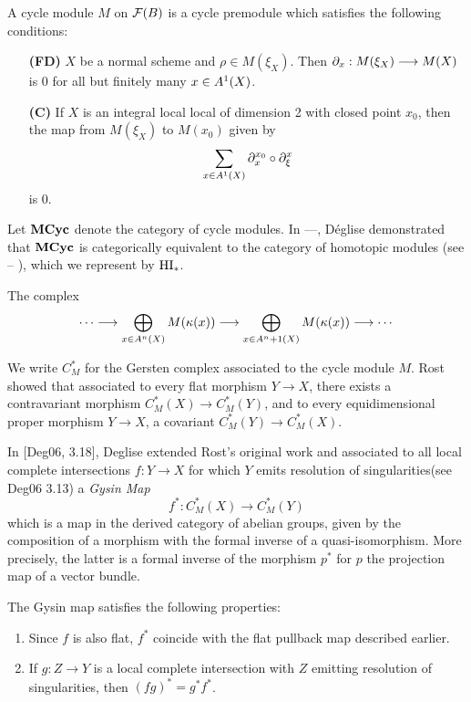 \begin{definition}
A cycle module $M$ on $\fields(B)$ is a cycle premodule which
satisfies the following conditions:

\begin{enumerate}
\item[\textbf{(FD)}]  
$X$ be a normal scheme and $\rho \in M(\xi_X)$. Then $\res{x}: 
M(\xi_X) \to M(X)$ is 0 for all but finitely many $x \in 
\subsch{1}{X}$.

\item[\textbf{(C)}]  If $X$ is an integral
local local of dimension 2 with closed point $x_0$, then the map 
from $M(\xi_X)$ to $M(x_0)$ given by
\[
\sum_{x \in \subsch{1}{X}} \ptres{x_0}{x} \comp \ptres{x}{\xi}
\]
is 0.
\end{enumerate}
\end{definition}

Let $\Cat{MCyc}$ denote the category of cycle modules. In ---,
D\'eglise demonstrated that $\Cat{MCyc}$ is categorically 
equivalent to the category of homotopic modules (see -- ), which
we represent by $\HI_*$. 

\vskip 10pt
The complex \[\gersseq{M}\]

We write $C_M^*$ for the Gersten complex associated to the cycle
module $M$. Rost showed that associated to every flat morphism 
$Y \to X$, there exists a contravariant morphism $C_M^*(X) \to 
C_M^*(Y)$, and to every equidimensional proper morphism $Y \to X$, 
a covariant $C_M^*(Y) \to C_M^*(X)$.

In [Deg06, 3.18], Deglise extended Rost's original work and 
associated to all local complete intersections $f: Y \to X$ for
which $Y$ emits resolution of singularities(see Deg06 3.13) a 
\emph{Gysin Map} 
\[
   f^*: C_M^*(X) \to C_M^*(Y)
\]
which is a map in the derived category of abelian groups, given 
by the composition of a morphism with the formal inverse of a 
quasi-isomorphism. More precisely, the latter is a formal inverse 
of the morphism $p^*$ for $p$ the projection map of a vector 
bundle. 

The Gysin map satisfies the following properties:
\begin{enumerate}
\item Since $f$ is also flat, $f^*$ coincide with the flat 
pullback map described earlier.

\item If $g: Z \to Y$ is a local complete intersection with $Z$
emitting resolution of singularities, then $(fg)^* = g^*f^*$.
\end{enumerate}

